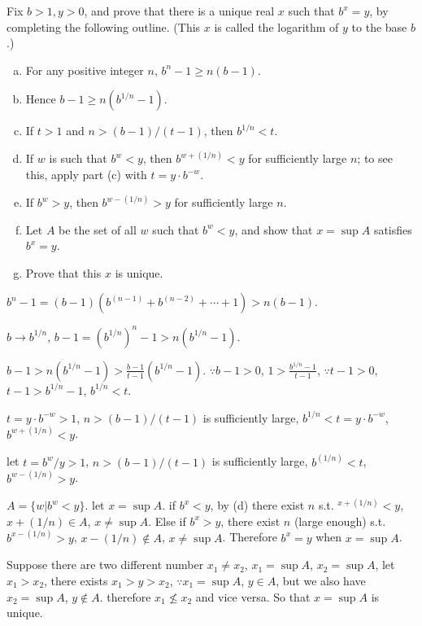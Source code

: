 
\begin{myExercise}
    \label{ex:1.7}
    Fix $b>1, y>0$, and prove that there is a unique real $x$ such that $b^x =y$, by
    completing the following outline. (This $x$ is called the logarithm of $y$ to the base $b$.)
    \begin{enumerate}[(a)]
        \item For any positive integer $n$, $b^n - 1 \geq n(b- 1)$.
        \item Hence $b- 1 \geq n(b^{1/n}-1)$.
        \item If $t>1$ and $n> (b-1)/(t-1)$, then $b^{1/n} < t$.
        \item If $w$ is such that $b^w < y$, then $b^{w+(1/n)} < y$ for sufficiently large $n$; to see this, apply part (c) with $t =y \cdot b^{-w}$.
        \item If $b^w > y$, then $b^{w-(1/n)} > y$ for sufficiently large $n$.
        \item Let $A$ be the set of all $w$ such that $b^w < y$, and show that $x = \sup A$ satisfies $b^x =y$.
        \item Prove that this $x$ is unique.
    \end{enumerate}
\end{myExercise}

\mySolve

\begin{asparaenum}[(a)]
        \item $b^n - 1 = (b-1)(b^{(n-1)} + b^{(n-2)} + \cdots + 1) > n(b-1)$.
        \item $b \rightarrow b^{1/n}$, $b - 1 = \left( b^{1/n} \right)^n -1 > n\left( b^{1/n}-1 \right)$.
        \item $b-1 > n(b^{1/n}-1) > \frac{b-1}{t-1}(b^{1/n}-1)$. $\because b-1 > 0$, $1 > \frac{b^{1/n}-1}{t-1}$, $\because t-1 >0$, $t-1 > b^{1/n}-1$, $b^{1/n} < t$.
        \item $t = y \cdot b^{-w} > 1$, $n > (b-1)/(t-1)$ is sufficiently large, $b^{1/n} < t = y \cdot b^{-w} $, $b^{w+(1/n)}<y$.
        \item let $t = b^{w}/y > 1$, $n > (b-1)/(t-1)$ is sufficiently large, $b^{(1/n)} < t$, $b^{w-(1/n)}>y$.
        \item $A = \{w|b^w<y\}$. let $x = \sup A$. if $b^x<y$, by (d) there exist $n$ s.t. $^{x+(1/n)}<y$, $x+(1/n) \in A$, $x \neq \sup A$. Else if $b^x>y$, there exist $n$ (large enough) s.t. $b^{x-(1/n)}>y$, $x-(1/n) \notin A$, $x \neq \sup A$. Therefore $b^x = y$ when $x = \sup A$.
        \item Suppose there are two different number $x_1 \neq x_2$, $x_1 = \sup A$, $x_2 = \sup A$, let $x_1 > x_2$, there exists $x_1 > y >x_2$, $\because x_1 = \sup A$, $y \in A$, but we also have $x_2 = \sup A$, $y \not\in A$. therefore $x_1 \nleq x_2$ and vice versa. So that $x = \sup A$ is unique.
    \end{asparaenum}




